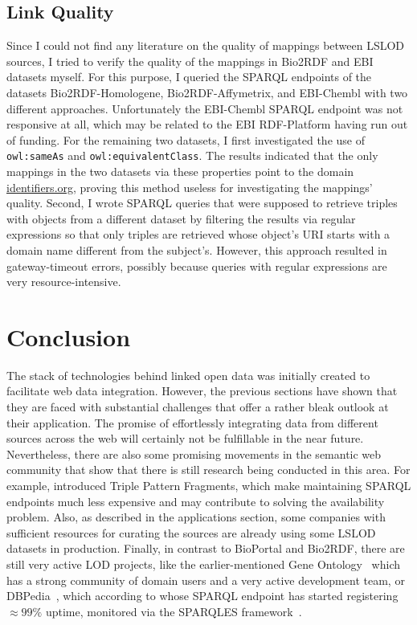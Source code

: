 \documentclass[runningheads]{llncs}
\begin{document}
    \subsection{Link Quality}
    Since I could not find any literature on the quality of mappings between LSLOD sources, I tried to verify the quality of the mappings in Bio2RDF and EBI datasets myself.
    For this purpose, I queried the SPARQL endpoints of the datasets Bio2RDF-Homologene, Bio2RDF-Affymetrix, and EBI-Chembl with two different approaches.
    Unfortunately the EBI-Chembl SPARQL endpoint was not responsive at all, which may be related to the EBI RDF-Platform having run out of funding.
    For the remaining two datasets, I first investigated the use of \texttt{owl:sameAs} and \texttt{owl:equivalentClass}.
    The results indicated that the only mappings in the two datasets via these properties point to the domain \url{identifiers.org}, proving this method useless for investigating the mappings' quality.
    Second, I wrote SPARQL queries that were supposed to retrieve triples with objects from a different dataset by filtering the results via regular expressions so that only triples are retrieved whose object's URI starts with a domain name different from the subject's.
    However, this approach resulted in gateway-timeout errors, possibly because queries with regular expressions are very resource-intensive.

    \section{Conclusion}
    The stack of technologies behind linked open data was initially created to facilitate web data integration.
    However, the previous sections have shown that they are faced with substantial challenges that offer a rather bleak outlook at their application.
    The promise of effortlessly integrating data from different sources across the web will certainly not be fulfillable in the near future.
    Nevertheless, there are also some promising movements in the semantic web community that show that there is still research being conducted in this area.
    For example, \citet{verborgh2016triple} introduced Triple Pattern Fragments, which make maintaining SPARQL endpoints much less expensive and may contribute to solving the availability problem.
    Also, as described in the applications section, some companies with sufficient resources for curating the sources are already using some LSLOD datasets in production.
    Finally, in contrast to BioPortal and Bio2RDF, there are still very active LOD projects, like the earlier-mentioned Gene Ontology~\citep{gene2015gene} which has a strong community of domain users and a very active development team, or DBPedia~\citep{auer2007dbpedia}, which according to \citet{kamdar2019enabling} whose SPARQL endpoint has started registering $\approx99\%$ uptime, monitored via the SPARQLES framework~\citep{vandenbussche2017sparqles}.

%
%
%
    
    
%
\end{document}
